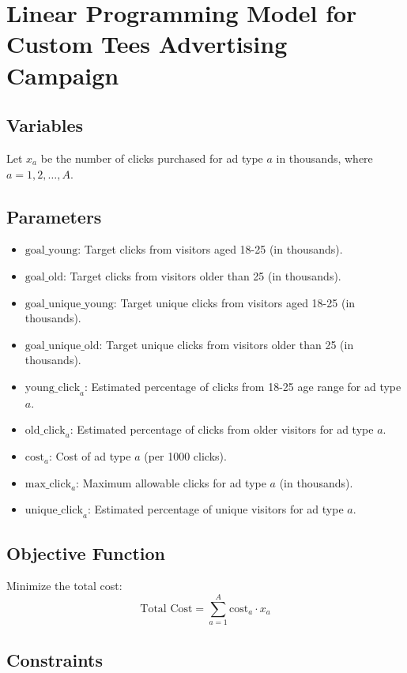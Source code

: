 \documentclass{article}
\begin{document}
\section*{Linear Programming Model for Custom Tees Advertising Campaign}

\subsection*{Variables}
Let \( x_a \) be the number of clicks purchased for ad type \( a \) in thousands, where \( a = 1, 2, \ldots, A \).

\subsection*{Parameters}
\begin{itemize}
    \item \( \text{goal\_young} \): Target clicks from visitors aged 18-25 (in thousands).
    \item \( \text{goal\_old} \): Target clicks from visitors older than 25 (in thousands).
    \item \( \text{goal\_unique\_young} \): Target unique clicks from visitors aged 18-25 (in thousands).
    \item \( \text{goal\_unique\_old} \): Target unique clicks from visitors older than 25 (in thousands).
    \item \( \text{young\_click}_a \): Estimated percentage of clicks from 18-25 age range for ad type \( a \).
    \item \( \text{old\_click}_a \): Estimated percentage of clicks from older visitors for ad type \( a \).
    \item \( \text{cost}_a \): Cost of ad type \( a \) (per 1000 clicks).
    \item \( \text{max\_click}_a \): Maximum allowable clicks for ad type \( a \) (in thousands).
    \item \( \text{unique\_click}_a \): Estimated percentage of unique visitors for ad type \( a \).
\end{itemize}

\subsection*{Objective Function}
Minimize the total cost:
\[
\text{Total Cost} = \sum_{a=1}^{A} \text{cost}_a \cdot x_a
\]

\subsection*{Constraints}
\end{document}
